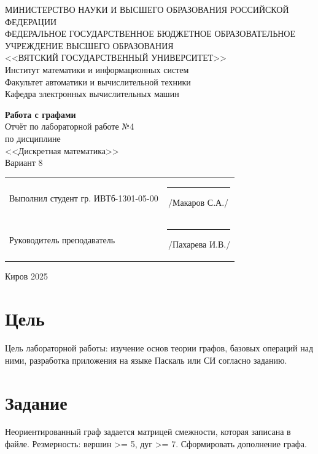 \documentclass[a4paper,14pt]{extarticle}
\begin{document}
  \newpage\thispagestyle{empty}
  \begin{center}
    \MakeUppercase{
      Министерство науки и высшего образования Российской Федерации\\
      Федеральное государственное бюджетное образовательное учреждение высшего образования\\
      <<Вятский Государственный Университет>>\\
    }
    Институт математики и информационных систем\\
    Факультет автоматики и вычислительной техники\\
    Кафедра электронных вычислительных машин
  \end{center}
  \vfill

  \begin{center}
    \textbf{Работа с графами}\\
    Отчёт по лабораторной работе №4\\
    по дисциплине\\
    <<Дискретная математика>>\\
    Вариант 8
  \end{center}
  \vfill

  \noindent
  \begin{tabular}{ll}
    Выполнил студент гр. ИВТб-1301-05-00 \hspace{5mm} &
    \rule[-1mm]{25mm}{0.10mm}\,/Макаров С.А./\\
    
    Руководитель преподаватель & \rule[-1mm]{25mm}{0.10mm}\,/Пахарева И.В./\\
  \end{tabular}

  \vfill
  \begin{center}
    Киров 2025
  \end{center}

  \newpage
  \section*{\hspace{12.5mm}Цель}
  Цель лабораторной работы: изучение основ теории графов, базовых операций над ними, разработка приложения на языке Паскаль или СИ согласно заданию.

  \section*{\hspace{12.5mm}Задание}
  Неориентированный граф задается матрицей смежности, которая записана в файле. Резмерность: вершин >= 5, дуг >= 7. Сформировать дополнение графа.
\end{document}
